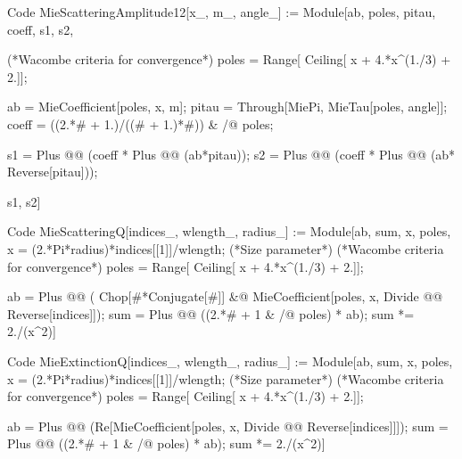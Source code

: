 {\footnotesize
\begin{mmaCell}[
	pattern = {x_, m_, x, m, angle_, angle, \#},
	local = {ab, poles, pitau, coeff,  s1, s2}
	]{Code}	
  MieScatteringAmplitude12[x_, m_, angle_] :=  
   Module[{ab, poles, pitau, coeff,  s1, s2},
   
   (*Wacombe criteria for convergence*)
   poles = Range[ Ceiling[ x + 4.*x^(1./3) + 2.]];
  
   ab = MieCoefficient[poles, x, m];
   pitau = Through[{MiePi, MieTau}[poles, angle]];
   coeff = ((2.*# + 1.)/((# + 1.)*#)) & /@ poles;
  
   s1 = Plus @@ (coeff * Plus @@ (ab*pitau));
   s2 = Plus @@ (coeff * Plus @@ (ab* Reverse[pitau]));
  
  {s1, s2}]
\end{mmaCell}
}

{\footnotesize
\begin{mmaCell}[
	pattern = {indices_, wlength_, radius_, indices, wlength, radius, \#},
	local = {ab, sum, x, poles}
	]{Code}	
  MieScatteringQ[indices_, wlength_, radius_] := 
   Module[{ab, sum, x, poles},
    x = (2.*Pi*radius)*indices[[1]]/wlength; (*Size parameter*)
    (*Wacombe criteria for convergence*)
    poles = Range[ Ceiling[ x + 4.*x^(1./3) + 2.]]; 
    
    ab = Plus @@ ( Chop[#*Conjugate[#]] &@ 
    		 MieCoefficient[poles, x, Divide @@ Reverse[indices]]);
    sum = Plus @@ ((2.*# + 1 & /@ poles) * ab);
   sum *= 2./(x^2)]
\end{mmaCell}
}

{\footnotesize
\begin{mmaCell}[
	pattern = {indices_, wlength_, radius_, indices, wlength, radius, \#},
	local = {ab, sum, x, poles}
	]{Code}	
  MieExtinctionQ[indices_, wlength_, radius_] := 
   Module[{ab, sum, x, poles},
    x = (2.*Pi*radius)*indices[[1]]/wlength; (*Size parameter*)
    (*Wacombe criteria for convergence*)
    poles = Range[ Ceiling[ x + 4.*x^(1./3) + 2.]]; 
    
    ab = Plus @@ (Re[MieCoefficient[poles, x, Divide @@ Reverse[indices]]]);
    sum = Plus @@ ((2.*# + 1 & /@ poles) * ab);
   sum *= 2./(x^2)]
\end{mmaCell}
}

